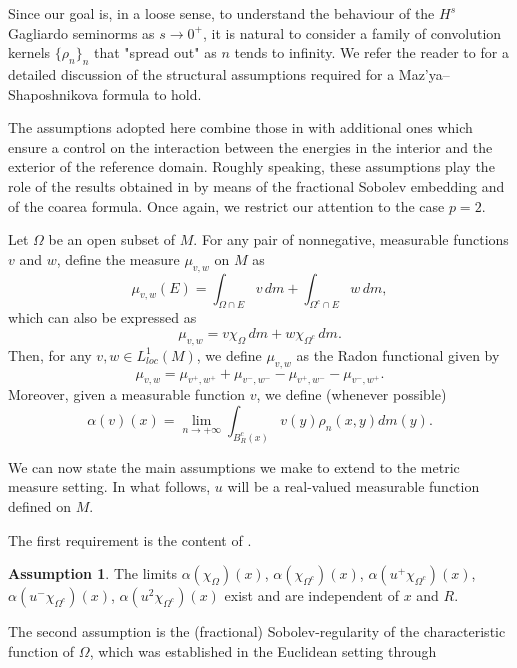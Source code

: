 \documentclass[reqno,11pt]{amsart}
\numberwithin{equation}{section}
\theoremstyle{definition} %
\theoremstyle{plain}
\theoremstyle{definition}
\newtheorem{hyp}[hyp]{Assumption}
\theoremstyle{remark}
\def\elle#1{L^{#1}}
\def\O{\Omega}
\begin{document}
Since our goal is, in a loose sense, to understand the behaviour of the $H^s$ Gagliardo seminorms as $s\to0^+$, it is natural to consider a family of convolution kernels $\{\rho_n\}_n$ that "spread out" as $n$ tends to infinity. We refer the reader to \cite{DaDfGioPi-Necess&Suff} for a detailed discussion of the structural assumptions required for a Maz’ya–Shaposhnikova formula to hold.

The assumptions adopted here combine those in \cite{HanPinamontiXu2025} with additional ones which ensure a control on the interaction between the energies in the interior and the exterior of the reference domain. Roughly speaking, these assumptions play the role of the results obtained in  by means of the fractional Sobolev embedding and of the coarea formula. Once again, we restrict our attention to the case $p=2$.

Let $\Omega$ be an open subset of $M$. For any pair of nonnegative, measurable functions $v$ and $w$, define the measure $\mu_{v,w}$ on $M$ as
\begin{equation}
    \mu_{v,w}(E)=\int_{\Omega\cap E} v\,dm+\int_{\Omega^c\cap E} w\,dm,
\end{equation}
which can also be expressed as 
\[
    \mu_{v,w}=v\chi_\Omega\,dm+w\chi_{\Omega^c}\,dm.
\]
Then, for any $v,w\in\elle1_{loc}(M)$, we define $\mu_{v,w}$ as the Radon functional given by
\[
\mu_{v,w}=\mu_{v^+,w^+}+\mu_{v^-,w^-}-\mu_{v^+,w^-}-\mu_{v^-,w^+}.
\]
Moreover, given a measurable function $v$, we define (whenever possible)
    \begin{equation}
        \alpha(v)(x)=\lim_{n\to+\infty}\int_{B_R^c(x)}{v(y)\rho_n(x,y)}dm(y).
    \end{equation}

We can now state the main assumptions we make to extend  to the metric measure setting. In what follows, $u$ will be a real-valued measurable function defined on $M$.

The first requirement is the content of .
\begin{hyp}\label{Ass:alphaexist}
    The limits $\alpha(\chi_{\O})(x)$, $\alpha(\chi_{\O^c})(x)$, $\alpha(u^+\chi_{\O^c})(x)$, $\alpha(u^-\chi_{\O^c})(x)$, $\alpha(u^2\chi_{\O^c})(x)$ exist and are independent of $x$ and $R$. 
\end{hyp}

The second assumption is the (fractional) Sobolev-regularity of the characteristic function of $\Omega$, which was established in the Euclidean setting through 
\end{document}
